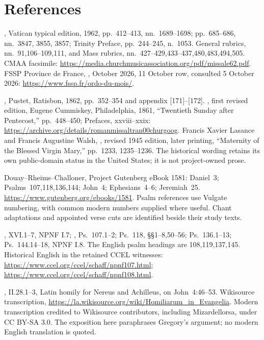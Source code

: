 \section{References}
\begin{description}[style=nextline,leftmargin=0pt,labelsep=0pt,itemsep=.45em]
\item[Missal and occurrence]
, Vatican typical edition, 1962, pp.~412--413,
nn.~1689--1698; pp.~685--686, nn.~3847, 3855, 3857; Trinity Preface,
pp.~244--245, n.~1053. General rubrics, nn.~91,106--109,111, and
Mass rubrics, nn.~427--429,433--437,480,483,494,505.
CMAA facsimile: \url{https://media.churchmusicassociation.org/pdf/missale62.pdf}.
FSSP Province de France, , October 2026, 11 October
row, consulted 5 October 2026: \url{https://www.fssp.fr/ordo-du-mois/}.

\item[Historical liturgical witnesses]
, Pustet, Ratisbon, 1862, pp.~352--354 and
appendix [171]--[172]. , first revised edition, Eugene
Cummiskey, Philadelphia, 1861, ``Twentieth Sunday after Pentecost,''
pp.~448--450; Prefaces, xxviii--xxix:
\url{https://archive.org/details/romanmissaltran00churgoog}.
Francis Xavier Lasance and Francis Augustine Walsh, , revised 1945 edition, later printing, ``Maternity of the Blessed
Virgin Mary,'' pp.~1233, 1235--1236. The historical wording retains its
own public-domain status in the United States; it is not project-owned prose.

\item[Scripture]
Douay--Rheims--Challoner, Project Gutenberg eBook 1581: Daniel~3;
Psalms~107,118,136,144; John~4; Ephesians~4--6; Jeremiah~25.
\url{https://www.gutenberg.org/ebooks/1581}.
Psalm references use Vulgate numbering, with common modern numbers supplied
where useful. Chant adaptations and appointed verse cuts are identified
beside their study texts.

\item[Augustine]
, XVI.1--7, NPNF I.7; , Ps.~107.1--2; Ps.~118, \S\S1--8,50--56; Ps.~136.1--13;
Ps.~144.14--18, NPNF I.8. The English psalm headings are 108,119,137,145.
Historical English in the retained CCEL witnesses:
\url{https://www.ccel.org/ccel/schaff/npnf107.html};
\url{https://www.ccel.org/ccel/schaff/npnf108.html}.

\item[Gregory the Great]
, II.28.1--3, Latin homily for Nereus
and Achilleus, on John~4:46--53. Wikisource transcription,
\url{https://la.wikisource.org/wiki/Homiliarum_in_Evangelia}.
Modern transcription credited to Wikisource contributors, including
Mizardellorsa, under CC BY-SA 3.0. The exposition here paraphrases
Gregory's argument; no modern English translation is quoted.


\end{description}

